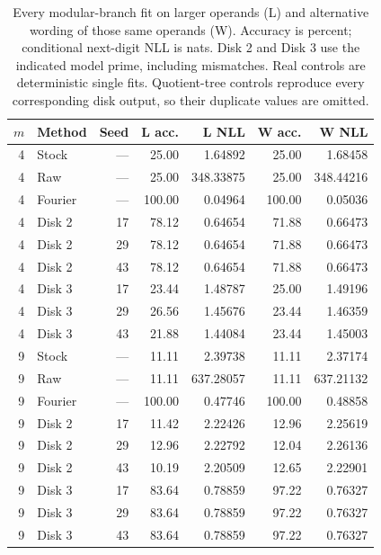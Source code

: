 \documentclass[11pt]{article}
\begin{document}
\begin{table}[htbp]
\centering\small
\caption{Every modular-branch fit on larger operands (L) and alternative
wording of those same operands (W). Accuracy is percent; conditional next-digit
NLL is nats. Disk 2 and Disk 3 use the indicated model prime, including mismatches.
Real controls are deterministic single fits. Quotient-tree controls reproduce
every corresponding disk output, so their duplicate values are omitted.}
\label{tab:modular-primary}
\begin{tabular}{rlrrrrr}
\toprule
$m$ & Method & Seed & L acc. & L NLL & W acc. & W NLL\\
\midrule
4 & Stock & --- & 25.00 & 1.64892 & 25.00 & 1.68458\\
4 & Raw & --- & 25.00 & 348.33875 & 25.00 & 348.44216\\
4 & Fourier & --- & 100.00 & 0.04964 & 100.00 & 0.05036\\
4 & Disk 2 & 17 & 78.12 & 0.64654 & 71.88 & 0.66473\\
4 & Disk 2 & 29 & 78.12 & 0.64654 & 71.88 & 0.66473\\
4 & Disk 2 & 43 & 78.12 & 0.64654 & 71.88 & 0.66473\\
4 & Disk 3 & 17 & 23.44 & 1.48787 & 25.00 & 1.49196\\
4 & Disk 3 & 29 & 26.56 & 1.45676 & 23.44 & 1.46359\\
4 & Disk 3 & 43 & 21.88 & 1.44084 & 23.44 & 1.45003\\
9 & Stock & --- & 11.11 & 2.39738 & 11.11 & 2.37174\\
9 & Raw & --- & 11.11 & 637.28057 & 11.11 & 637.21132\\
9 & Fourier & --- & 100.00 & 0.47746 & 100.00 & 0.48858\\
9 & Disk 2 & 17 & 11.42 & 2.22426 & 12.96 & 2.25619\\
9 & Disk 2 & 29 & 12.96 & 2.22792 & 12.04 & 2.26136\\
9 & Disk 2 & 43 & 10.19 & 2.20509 & 12.65 & 2.22901\\
9 & Disk 3 & 17 & 83.64 & 0.78859 & 97.22 & 0.76327\\
9 & Disk 3 & 29 & 83.64 & 0.78859 & 97.22 & 0.76327\\
9 & Disk 3 & 43 & 83.64 & 0.78859 & 97.22 & 0.76327\\
\bottomrule
\end{tabular}
\end{table}
\end{document}
